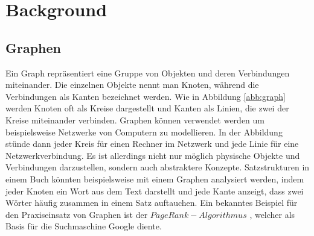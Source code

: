 \chapter{Background}
\section{Graphen}
Ein Graph repräsentiert eine Gruppe von Objekten und deren Verbindungen miteinander. Die einzelnen Objekte nennt man Knoten, während die Verbindungen als Kanten bezeichnet werden. Wie in Abbildung \ref{abb:graph} werden Knoten oft als Kreise dargestellt und Kanten als Linien, die zwei der Kreise miteinander verbinden. Graphen können verwendet werden um beispielsweise Netzwerke von Computern zu modellieren. In der Abbildung stünde dann jeder Kreis für einen Rechner im Netzwerk und jede Linie für eine Netzwerkverbindung. Es ist allerdings nicht nur möglich physische Objekte und Verbindungen darzustellen, sondern auch abstraktere Konzepte. Satzstrukturen in einem Buch könnten beispielsweise mit einem Graphen analysiert werden, indem jeder Knoten ein Wort aus dem Text darstellt und jede Kante anzeigt, dass zwei Wörter häufig zusammen in einem Satz auftauchen. Ein bekanntes Beispiel für den Praxiseinsatz von Graphen ist der $PageRank-Algorithmus$ \cite{page1999pagerank}, welcher als Basis für die Suchmaschine Google diente.


